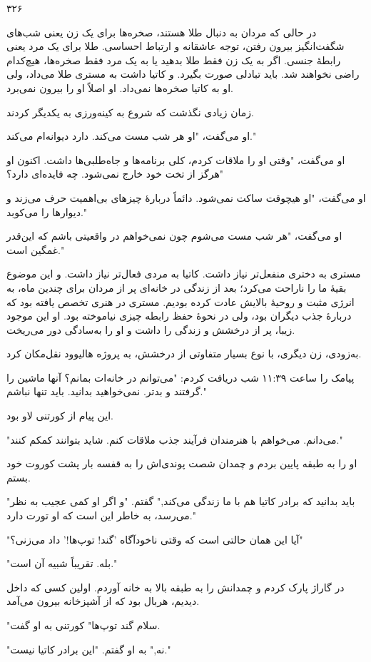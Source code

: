 ۳۲۶

در حالی که مردان به دنبال طلا هستند، صخره‌ها برای یک زن یعنی شب‌های شگفت‌انگیز بیرون رفتن، توجه عاشقانه و ارتباط احساسی. طلا برای یک مرد یعنی رابطهٔ جنسی. اگر به یک زن فقط طلا بدهید یا به یک مرد فقط صخره‌ها، هیچ‌کدام راضی نخواهند شد. باید تبادلی صورت بگیرد. و کاتیا داشت به مستری طلا می‌داد، ولی او به کاتیا صخره‌ها نمی‌داد. او اصلاً او را بیرون نمی‌برد.

زمان زیادی نگذشت که شروع به کینه‌ورزی به یکدیگر کردند.

او می‌گفت، "او هر شب مست می‌کند. دارد دیوانه‌ام می‌کند."

او می‌گفت، "وقتی او را ملاقات کردم، کلی برنامه‌ها و جاه‌طلبی‌ها داشت. اکنون او هرگز از تخت خود خارج نمی‌شود. چه فایده‌ای دارد؟"

او می‌گفت، "او هیچوقت ساکت نمی‌شود. دائماً دربارهٔ چیزهای بی‌اهمیت حرف می‌زند و دیوارها را می‌کوبد."

او می‌گفت، "هر شب مست می‌شوم چون نمی‌خواهم در واقعیتی باشم که این‌قدر غمگین است."

مستری به دختری منفعل‌تر نیاز داشت. کاتیا به مردی فعال‌تر نیاز داشت. و این موضوع بقیهٔ ما را ناراحت می‌کرد؛ بعد از زندگی در خانه‌ای پر از مردان برای چندین ماه، به انرژی مثبت و روحیهٔ بالایش عادت کرده بودیم. مستری در هنری تخصص یافته بود که دربارهٔ جذب دیگران بود، ولی در نحوهٔ حفظ رابطه چیزی نیاموخته بود. او این موجود زیبا، پر از درخشش و زندگی را داشت و او را به‌سادگی دور می‌ریخت.

به‌زودی، زن دیگری، با نوع بسیار متفاوتی از درخشش، به پروژه هالیوود نقل‌مکان کرد.

پیامک را ساعت ۱۱:۳۹ شب دریافت کردم: "می‌توانم در خانه‌ات بمانم؟ آنها ماشین را گرفتند و بدتر. نمی‌خواهید بدانید. باید تنها نباشم."

این پیام از کورتنی لاو بود.

"می‌دانم. می‌خواهم با هنرمندان فرآیند جذب ملاقات کنم. شاید بتوانند کمکم کنند."

او را به طبقه پایین بردم و چمدان شصت پوندی‌اش را به قفسه بار پشت کوروت خود بستم.

"باید بدانید که برادر کاتیا هم با ما زندگی می‌کند," گفتم. "و اگر او کمی عجیب به نظر می‌رسد، به خاطر این است که او تورت دارد."

"آیا این همان حالتی است که وقتی ناخودآگاه 'گند! توپ‌ها!' داد می‌زنی؟"

"بله. تقریباً شبیه آن است."

در گاراژ پارک کردم و چمدانش را به طبقه بالا به خانه آوردم. اولین کسی که داخل دیدیم، هربال بود که از آشپزخانه بیرون می‌آمد.

"سلام گند توپ‌ها" کورتنی به او گفت.

"نه," به او گفتم. "این برادر کاتیا نیست."
